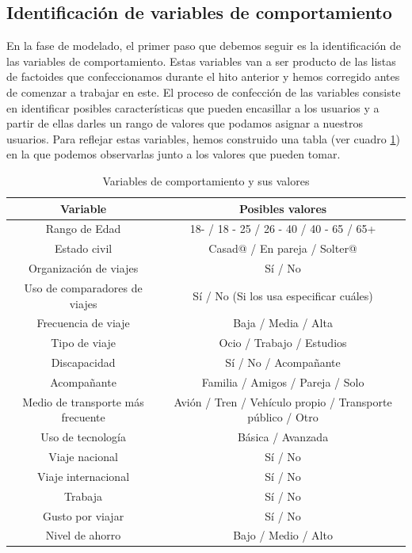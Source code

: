 \subsection{Identificación de variables de comportamiento}
En la fase de modelado, el primer paso que debemos seguir es la identificación de las variables de comportamiento. Estas variables van a ser producto de las listas de factoides que confeccionamos durante el hito anterior y hemos corregido antes de comenzar a trabajar en este. El proceso de confección de las variables consiste en identificar posibles características que pueden encasillar a los usuarios y a partir de ellas darles un rango de valores que podamos asignar a nuestros usuarios. Para reflejar estas variables, hemos construido una tabla (ver cuadro \ref{table:variables-comportamiento}) en la que podemos observarlas junto a los valores que pueden tomar.
\begin{table}[h]
    \centering
    \begin{tabular}{|c|c|}
        \hline
        \textbf{Variable} & \textbf{Posibles valores} \\ \hline
        Rango de Edad & 18- / 18 - 25 / 26 - 40 / 40 - 65 / 65+ \\ \hline
        Estado civil & Casad@ / En pareja / Solter@ \\ \hline
        Organización de viajes & Sí / No \\ \hline
        Uso de comparadores de viajes & Sí / No (Si los usa especificar cuáles) \\ \hline
        Frecuencia de viaje & Baja / Media / Alta \\ \hline
        Tipo de viaje & Ocio / Trabajo / Estudios \\ \hline
        Discapacidad & Sí / No / Acompañante \\ \hline
        Acompañante & Familia / Amigos / Pareja / Solo \\ \hline
        Medio de transporte más frecuente & Avión / Tren / Vehículo propio / Transporte público / Otro \\ \hline
        Uso de tecnología & Básica / Avanzada \\ \hline
        Viaje nacional & Sí / No \\ \hline
        Viaje internacional & Sí / No \\ \hline
        Trabaja & Sí / No \\ \hline
        Gusto por viajar & Sí / No \\ \hline
        Nivel de ahorro & Bajo / Medio / Alto \\ \hline
    \end{tabular}
    \caption{Variables de comportamiento y sus valores}
    \label{table:variables-comportamiento}
\end{table}

